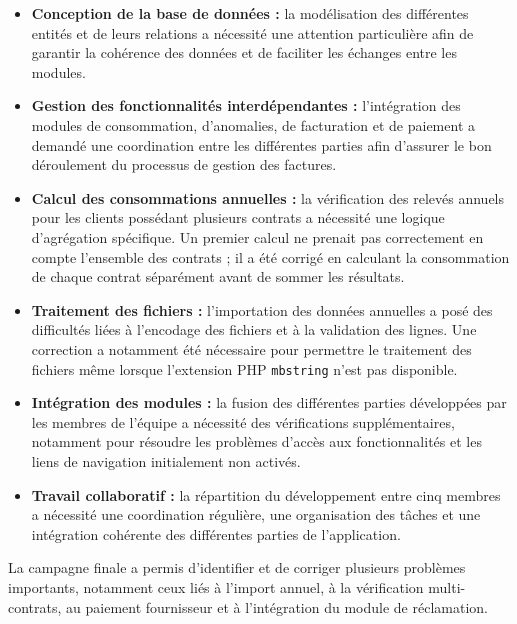 \begin{itemize}
    \item \textbf{Conception de la base de données :} la modélisation des différentes entités et de leurs relations a nécessité une attention particulière afin de garantir la cohérence des données et de faciliter les échanges entre les modules.

    \item \textbf{Gestion des fonctionnalités interdépendantes :} l'intégration des modules de consommation, d'anomalies, de facturation et de paiement a demandé une coordination entre les différentes parties afin d'assurer le bon déroulement du processus de gestion des factures.

    \item \textbf{Calcul des consommations annuelles :} la vérification des relevés annuels pour les clients possédant plusieurs contrats a nécessité une logique d'agrégation spécifique. Un premier calcul ne prenait pas correctement en compte l'ensemble des contrats ; il a été corrigé en calculant la consommation de chaque contrat séparément avant de sommer les résultats.

    \item \textbf{Traitement des fichiers :} l'importation des données annuelles a posé des difficultés liées à l'encodage des fichiers et à la validation des lignes. Une correction a notamment été nécessaire pour permettre le traitement des fichiers même lorsque l'extension PHP \texttt{mbstring} n'est pas disponible.

    \item \textbf{Intégration des modules :} la fusion des différentes parties développées par les membres de l'équipe a nécessité des vérifications supplémentaires, notamment pour résoudre les problèmes d'accès aux fonctionnalités et les liens de navigation initialement non activés.

    \item \textbf{Travail collaboratif :} la répartition du développement entre cinq membres a nécessité une coordination régulière, une organisation des tâches et une intégration cohérente des différentes parties de l'application.
\end{itemize}

La campagne finale a permis d'identifier et de corriger plusieurs problèmes importants, notamment ceux liés à l'import annuel, à la vérification multi-contrats, au paiement fournisseur et à l'intégration du module de réclamation.

